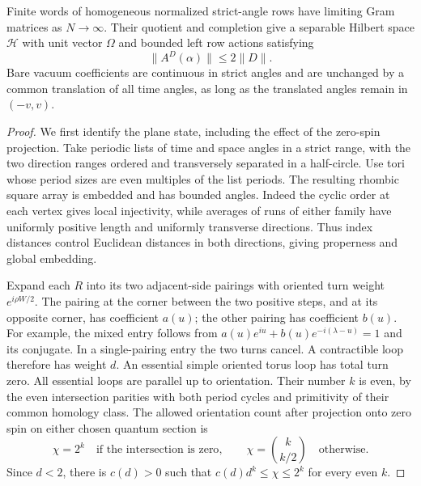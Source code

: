 \begin{lemma}\label{bulk:plane-kernels}
Finite words of homogeneous normalized strict-angle rows have
limiting Gram matrices as $N\to\infty$. Their quotient and completion
give a separable Hilbert space $\mathcal H$ with unit vector $\Omega$
and bounded left row actions satisfying
\begin{equation}\label{bulk:row-bound}
 \|A^D(\alpha)\|\le2\|D\|.
\end{equation}
Bare vacuum coefficients are continuous in strict angles and are
unchanged by a common translation of all time angles, as long as
the translated angles remain in $(-v,v)$.
\end{lemma}

\begin{proof}
We first identify the plane state, including the effect of the
zero-spin projection. Take periodic lists of time and space angles
in a strict range, with the two direction ranges ordered and
transversely separated in a half-circle. Use tori whose period
sizes are even multiples of the list periods. The resulting
rhombic square array is embedded and has bounded angles. Indeed
the cyclic order at each vertex gives local injectivity, while
averages of runs of either family have uniformly positive length
and uniformly transverse directions. Thus index distances control
Euclidean distances in both directions, giving properness and
global embedding.

Expand each $R$ into its two adjacent-side pairings with oriented
turn weight $e^{i\rho W/2}$. The pairing at the corner between the
two positive steps, and at its opposite corner, has coefficient
$a(u)$; the other pairing has coefficient $b(u)$. For example, the
mixed entry follows from
$a(u)e^{iu}+b(u)e^{-i(\lambda-u)}=1$ and its conjugate. In a
single-pairing entry the two turns cancel. A contractible loop
therefore has weight $d$. An essential simple oriented torus loop
has total turn zero. All essential loops are parallel up to
orientation. Their number $k$ is even, by the even intersection
parities with both period cycles and primitivity of their common
homology class. The allowed orientation count after projection
onto zero spin on either chosen quantum section is
\begin{equation}\label{bulk:essential-count}
 \chi=2^k\quad\text{if the intersection is zero},\qquad
 \chi=\binom{k}{k/2}\quad\text{otherwise}.
\end{equation}
Since $d<2$, there is $c(d)>0$ such that
$c(d)d^k\le\chi\le2^k$ for every even $k$.


\end{proof}
